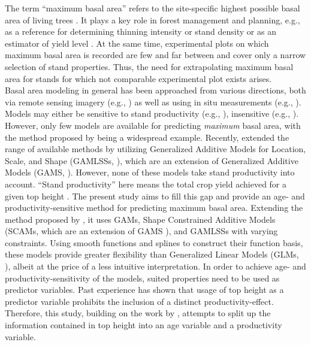 The term ``maximum basal area'' refers to the site-specific highest possible basal area of living trees \parencite{Assmann1970}.  It plays a key role in forest management and planning, e.g., as a reference for determining thinning intensity \parencite{Assmann1961,Doebbeler2002} or stand density \parencite{Spellmann1999} or as an estimator of yield level \parencite{Franz1967}.  At the same time, experimental plots on which maximum basal area is recorded are few and far between and cover only a narrow selection of stand properties.  Thus, the need for extrapolating maximum basal area for stands for which not comparable experimental plot exists arises.  \\
Basal area modeling in general has been approached from various directions, both via remote sensing imagery (e.g., \textcite{Silva2017}) as well as using in situ measurements (e.g., \textcite{Yue2012}).  Models may either be sensitive to stand productivity (e.g., \textcite{Castedo-Dorado2007}), insensitive (e.g., \textcite{Monserud1996}).  However, only few models are available for predicting \emph{maximum} basal area, with the method proposed by \textcite{Sterba1975} being a widespread example.  Recently, \textcite{Woerdehoff2014,Woerdehoff2016} extended the range of available methods by utilizing Generalized Additive Models for Location, Scale, and Shape (GAMLSSs, \textcite{Rigby2001}), which are an extension of Generalized Additive Models (GAMS, \textcite{Hastie1991}).  However, none of these models take stand productivity into account.  ``Stand productivity'' here means the total crop yield achieved for a given top height \parencite{Assmann1970}.  The present study aims to fill this gap and provide an age- and productivity-sensitive method for predicting maximum basal area.  Extending the method proposed by \textcite{Woerdehoff2016}, it uses GAMs, Shape Constrained Additive Models (SCAMs, which are an extension of GAMS \parencite{Pya2010}), and GAMLSSs with varying constraints.  Using smooth functions and splines to construct their function basis, these models provide greater flexibility than Generalized Linear Models (GLMs, \textcite{Nelder1972}), albeit at the price of a less intuitive interpretation.  In order to achieve age- and productivity-sensitivity of the models, suited properties need to be used as predictor variables.  Past experience has shown that usage of top height as a predictor variable prohibits the inclusion of a distinct productivity-effect.  Therefore, this study, building on the work by \textcite{Nagel1999}, attempts to split up the information contained in top height into an age variable and a productivity variable.

